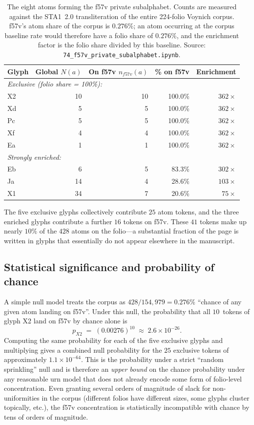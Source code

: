 \begin{table}[h]
\centering
\small
\begin{tabular}{lrrrr}
\toprule
Glyph & Global $N(a)$ & On f57v $n_{f57v}(a)$ & \% on f57v & Enrichment \\
\midrule
\multicolumn{5}{l}{\emph{Exclusive (folio share = 100\%):}} \\
X2 & 10 & 10 & 100.0\% & $362\times$ \\
Xd & 5  & 5  & 100.0\% & $362\times$ \\
Pc & 5  & 5  & 100.0\% & $362\times$ \\
Xf & 4  & 4  & 100.0\% & $362\times$ \\
Ea & 1  & 1  & 100.0\% & $362\times$ \\
\midrule
\multicolumn{5}{l}{\emph{Strongly enriched:}} \\
Eb & 6  & 5  & 83.3\%  & $302\times$ \\
Ja & 14 & 4  & 28.6\%  & $103\times$ \\
X1 & 34 & 7  & 20.6\%  & $\phantom{0}75\times$ \\
\bottomrule
\end{tabular}
\caption{The eight atoms forming the f57v private subalphabet. Counts are
measured against the STA1~2.0 transliteration of the entire 224-folio Voynich
corpus. f57v's atom share of the corpus is $0.276\%$; an atom occurring at
the corpus baseline rate would therefore have a folio share of $0.276\%$, and
the enrichment factor is the folio share divided by this baseline. Source:
\texttt{74\_f57v\_private\_subalphabet.ipynb}.}
\label{tab:subalphabet}
\end{table}

The five exclusive glyphs collectively contribute $25$ atom tokens, and the
three enriched glyphs contribute a further $16$ tokens on f57v. These $41$
tokens make up nearly $10\%$ of the $428$ atoms on the folio---a substantial
fraction of the page is written in glyphs that essentially do not appear
elsewhere in the manuscript.

\subsection{Statistical significance and probability of chance}
\label{sec:probability}

A simple null model treats the corpus as $428/154{,}979 = 0.276\%$ ``chance
of any given atom landing on f57v''. Under this null, the probability that
all $10$~tokens of glyph X2 land on f57v by chance alone is
\[
p_{X2} \;=\; (0.00276)^{10} \;\approx\; 2.6\times 10^{-26}.
\]
Computing the same probability for each of the five exclusive glyphs and
multiplying gives a combined null probability for the $25$ exclusive tokens
of approximately $1.1\times 10^{-64}$. This is the probability under a
strict ``random sprinkling'' null and is therefore an \emph{upper bound} on
the chance probability under any reasonable urn model that does not already
encode some form of folio-level concentration. Even granting several orders
of magnitude of slack for non-uniformities in the corpus (different folios
have different sizes, some glyphs cluster topically, etc.), the f57v
concentration is statistically incompatible with chance by tens of orders of
magnitude.

